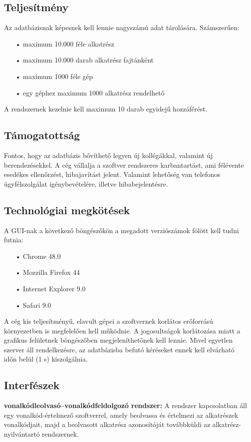 \documentclass[12pt]{article}\usepackage[left=20mm,right=20mm,top=14mm,bottom=20mm]{geometry}
\begin{document}
\subsection{Teljesítmény}
Az adatbázisnak képesnek kell lennie nagyszámú adat tárolására. 
Számszerűen:
\begin{itemize}
\item[•] maximum 10.000 féle alkatrész
\item[•] maximum 10.000 darab alkatrész fajtánként
\item[•] maximum 1000 féle gép
\item[•] egy géphez maximum 1000 alkatrész rendelhető
\end{itemize}

A rendszernek kezelnie kell maximum 10 darab egyidejű hozzáférést. 

\subsection{Támogatottság}
Fontos, hogy az adatbázis bővíthető legyen új kollégákkal, valamint új berendezésekkel.
A cég vállalja a szoftver rendszeres karbantartást, ami félévente esedékes ellenőrzést, hibajavítást jelent.
Valamint lehetőség van telefonos ügyfélszolgálat igénybevételére, illetve hibabejelentésre.

\subsection{Technológiai megkötések}
A GUI-nak a következő böngészőkön a megadott verziószámok fölött kell tudni futnia:
\begin{itemize}
\item[•] Chrome 48.0
\item[•] Mozzilla Firefox 44
\item[•] Internet Explorer 9.0
\item[•] Safari 9.0
\end{itemize}

A cég kis teljesítményű, elavult gépei a szoftvernek korlátos erőforrású környezetben is megfelelően kell működnie. 
A jogosultságok korlátozása miatt a grafikus felületnek böngészőben megjeleníthetőnek kell lennie.
Mivel egyetlen szerver áll rendelkezésre, az adatbázisba befutó kéréseket ennek kell elvárható időn belül (1 s) kiszolgálnia.

\subsection{Interfészek}
\noindent\textbf{vonalkódleolvasó--vonalkódfeldolgozó rendszer: } A rendszer kapcsolatban áll egy vonalkód-értelmező szoftverrel, amely beolvassa és értelmezi az alkatrészek vonalkódjait, majd a beolvasott alkatrész azonosítóját továbbküldi az alkatrész-nyilvántartó rendszernek.
\end{document}
